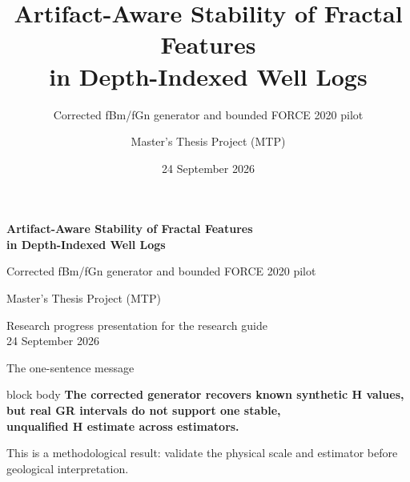 \documentclass[aspectratio=169,11pt]{beamer}
\title{Artifact-Aware Stability of Fractal Features\\in Depth-Indexed Well Logs}
\subtitle{Corrected fBm/fGn generator and bounded FORCE 2020 pilot}
\author{Master's Thesis Project (MTP)}
\institute{Research progress presentation for the research guide}
\date{24 September 2026}
\begin{document}
{
\begin{frame}[plain]
\vspace{0.7cm}
\hspace{0.35cm}\begin{minipage}{0.87\textwidth}
{\color{white}\fontsize{25}{30}\selectfont\bfseries Artifact-Aware Stability of Fractal Features\\[0.12cm]in Depth-Indexed Well Logs\par}
\vspace{0.55cm}
{\color{white!85!Navy}\Large Corrected fBm/fGn generator and bounded FORCE 2020 pilot\par}
\vfill
{\color{white}\large Master's Thesis Project (MTP)\par}
\vspace{0.15cm}
{\color{white!80!Navy}\normalsize Research progress presentation for the research guide\\24 September 2026\par}
\end{minipage}
\end{frame}}

\begin{frame}{The one-sentence message}
\begin{center}
\vspace{0.35cm}
\begin{beamercolorbox}[sep=0.5cm,wd=.9\textwidth]{block body}
\centering\Large\bfseries
The corrected generator recovers known synthetic H values,\\[0.15cm]
but real GR intervals do not support one stable,\\[0.15cm]
unqualified H estimate across estimators.
\end{beamercolorbox}
\vspace{0.55cm}
\normalsize
This is a methodological result: \alert{validate the physical scale and estimator before geological interpretation.}
\end{center}
\end{frame}
\end{document}
